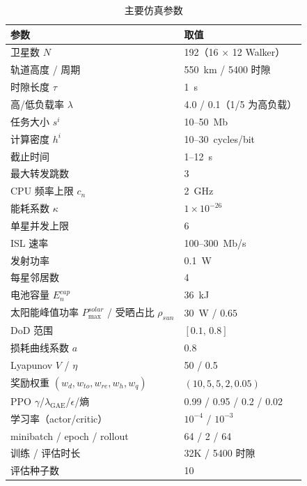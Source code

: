 \documentclass[a4paper,11pt]{article}
\begin{document}
\begin{table}[t]
\centering
\caption{主要仿真参数}
\label{tab:sim_params}
\begin{tabular}{ll}
\hline
参数 & 取值 \\
\hline
卫星数 $N$ & 192（16 $\times$ 12 Walker）\\
轨道高度 / 周期 & 550~km / 5400 时隙 \\
时隙长度 $\tau$ & 1~s \\
高/低负载率 $\lambda$ & 4.0 / 0.1（1/5 为高负载）\\
任务大小 $s^i$ & 10--50~Mb \\
计算密度 $h^i$ & 10--30~cycles/bit~\cite{zhang2024mhspo} \\
截止时间 & 1--12~s \\
最大转发跳数 & 3 \\
CPU 频率上限 $c_n$ & 2~GHz~\cite{zhang2024mhspo} \\
能耗系数 $\kappa$ & $1\times10^{-26}$~\cite{zhang2024mhspo} \\
单星并发上限 & 6 \\
ISL 速率 & 100--300~Mb/s \\
发射功率 & 0.1~W \\
每星邻居数 & 4 \\
电池容量 $E^{cap}_n$ & 36~kJ \\
太阳能峰值功率 $P^{solar}_{\max}$ / 受晒占比 $\rho_{sun}$ & $30$~W / $0.65$ \\
DoD 范围 & $[0.1,\,0.8]$ \\
损耗曲线系数 $a$ & 0.8 \\
Lyapunov $V$ / $\eta$ & 50 / 0.5 \\
奖励权重 $(w_d,w_{to},w_{re},w_h,w_q)$ & $(10,5,5,2,0.05)$ \\
PPO $\gamma$/$\lambda_{\text{GAE}}$/$\epsilon$/熵 & 0.99 / 0.95 / 0.2 / 0.02 \\
学习率（actor/critic） & $10^{-4}$ / $10^{-3}$ \\
minibatch / epoch / rollout & 64 / 2 / 64 \\
训练 / 评估时长 & 32K / 5400 时隙 \\
评估种子数 & 10 \\
\hline
\end{tabular}
\end{table}
\end{document}
